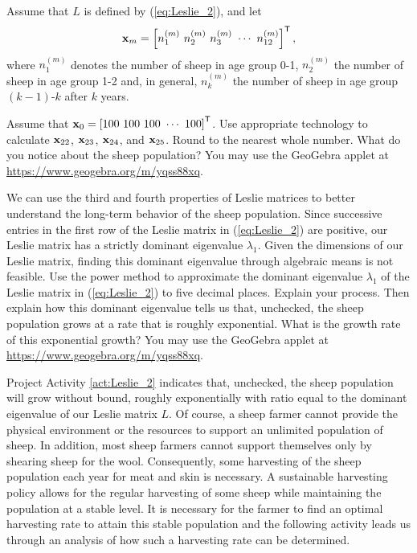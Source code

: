 \begin{pactivity} \label{act:Leslie_2} Assume that $L$ is defined by (\ref{eq:Leslie_2}), and let 
\[\mathbf{x}_m = \left[ n_1^{(m)} \ n_2^{(m)} \ n_3^{(m)} \ \cdots \ n_{12}^{(m)} \right]^{\mathsf{T}},\]
 where $n_1^{(m)}$ denotes the number of sheep in age group 0-1, $n_2^{(m)}$ the number of sheep in age group 1-2 and, in general, $n_k^{(m)}$ the number of sheep in age group $(k-1)$-$k$ after $k$ years. 
 	\ba
	 \item Assume that $\mathbf{x}_0 = \left[100 \ 100 \ 100 \ \cdots \ 100  \right]^{\mathsf{T}}$. Use appropriate technology to calculate $\mathbf{x}_{22}$, $\mathbf{x}_{23}$, $\mathbf{x}_{24}$, and $\mathbf{x}_{25}$. Round to the nearest whole number. What do you notice about the sheep population?  You may use the GeoGebra applet at \url{https://www.geogebra.org/m/yqss88xq}. 

	\item  We can use the third and fourth properties of Leslie matrices to better understand the long-term behavior of the sheep population. Since successive entries in the first row of the Leslie matrix in (\ref{eq:Leslie_2}) are positive, our Leslie matrix has a strictly dominant eigenvalue $\lambda_1$. Given the dimensions of our Leslie matrix, finding this dominant eigenvalue through algebraic means is not feasible. Use the power method to approximate the dominant eigenvalue $\lambda_1$ of the Leslie matrix in (\ref{eq:Leslie_2}) to five decimal places. Explain your process. Then explain how this dominant eigenvalue tells us that, unchecked, the sheep population grows at a rate that is roughly exponential. What is the growth rate of this exponential growth?  You may use the GeoGebra applet at \url{https://www.geogebra.org/m/yqss88xq}. 

	\ea

\end{pactivity}


Project Activity \ref{act:Leslie_2} indicates that, unchecked, the sheep population will grow without bound, roughly exponentially with ratio equal to the dominant eigenvalue of our Leslie matrix $L$. Of course, a sheep farmer cannot provide the physical environment or the resources to support an unlimited population of sheep. In addition, most sheep farmers cannot support themselves only by shearing sheep for the wool. Consequently, some harvesting of the sheep population each year for meat and skin is necessary. A sustainable harvesting policy allows for the regular harvesting of some sheep while maintaining the population at a stable level. It is necessary for the farmer to find an optimal harvesting rate to attain this stable population and the following activity leads us through an analysis of how such a harvesting rate can be determined.

